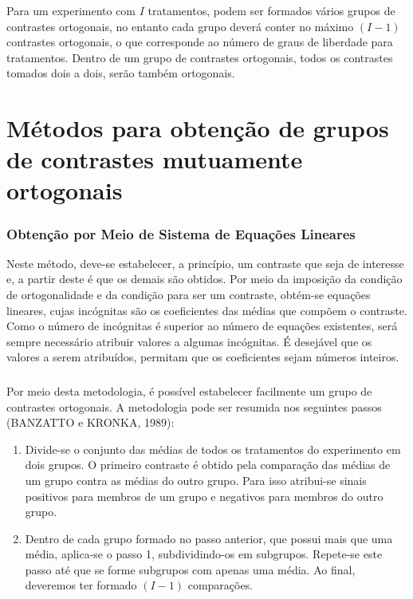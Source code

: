 \documentclass[14pt,aspectratio=1610]{beamer}
\begin{document}
\begin{frame}{}
\frametitle{}
\begin{block}{}
\justifying
Para um experimento com $I$ tratamentos, podem ser formados vários grupos de
contrastes ortogonais, no entanto cada grupo deverá conter no máximo $(I-1)$ contrastes
ortogonais, o que corresponde ao número de graus de liberdade para tratamentos.
Dentro de um grupo de contrastes ortogonais, todos os contrastes tomados dois a
dois, serão também ortogonais.
\end{block}
\end{frame}

\section{Métodos para obtenção de grupos de contrastes mutuamente ortogonais}
\begin{frame}{}
\frametitle{Obtenção por Meio de Sistema de Equações Lineares}
\begin{block}{}
\justifying
Neste método, deve-se estabelecer, a princípio, um contraste que seja de interesse
e, a partir deste é que os demais são obtidos. Por meio da imposição da condição de
ortogonalidade e da condição para ser um contraste, obtém-se equações lineares, cujas
incógnitas são os coeficientes das médias que compõem o contraste. Como o número de
incógnitas é superior ao número de equações existentes, será sempre necessário atribuir
valores a algumas incógnitas. É desejável que os valores a serem atribuídos, permitam
que os coeficientes sejam números inteiros.
\end{block}
\end{frame}

\begin{frame}{}
\frametitle{}
\begin{block}{}
\justifying
Por meio desta metodologia, é possível estabelecer facilmente um grupo de
contrastes ortogonais. A metodologia pode ser resumida nos seguintes passos
(BANZATTO e KRONKA, 1989):
\begin{enumerate}
\item Divide-se o conjunto das médias de todos os tratamentos do experimento em dois
grupos. O primeiro contraste é obtido pela comparação das médias de um grupo contra
as médias do outro grupo. Para isso atribui-se sinais positivos para membros de um grupo e negativos para membros do outro grupo.\pause
\item Dentro de cada grupo formado no passo anterior, que possui mais que uma média,
aplica-se o passo 1, subdividindo-os em subgrupos. Repete-se este passo até que se
forme subgrupos com apenas uma média. Ao final, deveremos ter formado $(I-1)$
comparações.
\end{enumerate}
\end{block}
\end{frame}
\end{document}
